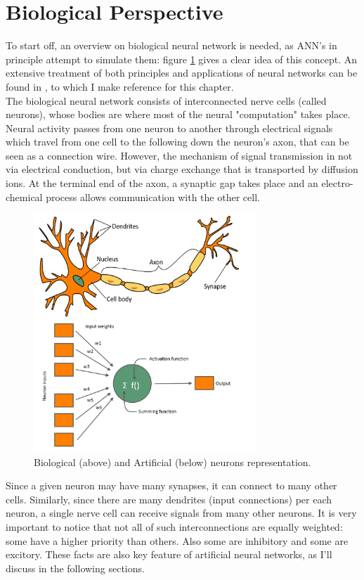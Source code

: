 \documentclass[%
    corpo=11pt,
    twoside,
    stile=classica,
    oldstyle,
    autoretitolo,
    tipotesi=magistrale,
    greek,
    evenboxes,
    english
]{toptesi}
\begin{document}
\section{Biological Perspective}
To start off, an overview on biological neural network is needed, as ANN's in principle attempt to simulate them: figure \ref{fig:artificialneuron} gives a clear idea of this concept. An extensive treatment of both principles and applications of neural networks can be found in \cite{graupe}, to which I make reference for this chapter. \\
The biological neural network consists of interconnected nerve cells (called neurons), whose bodies are where most of the neural "computation" takes place. Neural activity passes from one neuron to another through electrical signals which travel from one cell to the following down the neuron's axon, that can be seen as a connection wire. However, the mechanism of signal transmission in not via electrical conduction, but via charge exchange that is transported by diffusion ions. At the terminal end of the axon, a synaptic gap takes place and an electro-chemical process allows communication with the other cell. \\
\begin{figure}[h]
\centering
\includegraphics[width=0.75\textwidth]{pictures/neuron_biological_artificial.jpg}
\caption{Biological (above) and Artificial (below) neurons representation.}
\label{fig:artificialneuron}
\end{figure}
Since a given neuron may have many synapses, it can connect to many other cells. Similarly, since there are many dendrites (input connections) per each neuron, a single nerve cell can receive signals from many other neurons. It is very important to notice that not all of such interconnections are equally weighted: some have a higher priority than others. Also some are inhibitory and some are excitory. These facts are also key feature of artificial neural networks, as I'll discuss in the following sections.
\newpage
\end{document}
